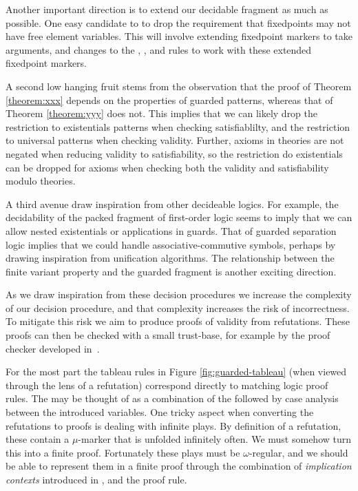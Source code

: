 Another important direction is to extend our decidable fragment as much as possible.
One easy candidate to to drop the requirement that fixedpoints may not have free
element variables. This will involve extending fixedpoint markers to take arguments,
and changes to the , , and  rules to work with these extended fixedpoint markers.

A second low hanging fruit stems from the observation that
the proof of Theorem \ref{theorem:xxx} depends on the properties of guarded patterns,
whereas that of Theorem \ref{theorem:yyy} does not.
This implies that we can likely drop the restriction to existentials patterns
when checking satisfiablilty, and the restriction to universal patterns when checking validity.
Further, axioms in theories are not negated when reducing validity to satisfiability,
so the restriction do existentials can be dropped for axioms when checking
both the validity and satisfiability modulo theories.

A third avenue draw inspiration from other decideable logics. For example, the
decidability of the packed fragment of first-order logic \cite{marx2001-tolerance-logic} seems
to imply that we can allow nested existentials or applications in guards. That
of guarded separation logic \cite{guarded-separation-logic} implies that we could
handle associative-commutive symbols, perhaps by drawing inspiration from
unification algorithms. The relationship between the finite variant property and
the guarded fragment is another exciting direction.
\newline

As we draw inspiration from these decision procedures we increase the complexity
of our decision procedure, and that complexity increases the risk of incorrectness.
To mitigate this risk we aim to produce proofs of validity from refutations.
These proofs can then be checked with a small trust-base, for example by the proof checker
developed in~\cite{chen-lin-trinh-rosu-2021-cav}.

For the most part the tableau rules in Figure \ref{fig:guarded-tableau}
(when viewed through the lens of a refutation) correspond directly
to matching logic proof rules.
The  may be thought of as a combination of the 
followed by case analysis between the introduced variables.
One tricky aspect when converting the refutations to proofs is dealing with infinite plays.
By definition of a refutation, these contain a \(\mu\)-marker that is unfolded infinitely often.
We must somehow turn this into a finite proof.
Fortunately these plays must be \(\omega\)-regular, and we should be able to
represent them in a finite proof
through the combination of \emph{implication contexts} introduced in \cite{towards-a-unified-framework},
and the  proof rule.

